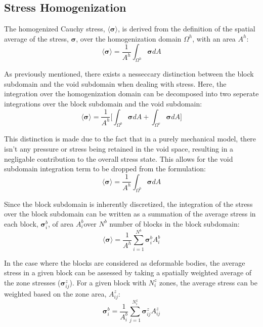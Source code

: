 \subsection{Stress Homogenization}
The homogenized Cauchy stress, $\langle \boldsymbol{\sigma} \rangle$, is derived from the definition of the spatial average of the stress, $\boldsymbol{\sigma}$, over the homogenization domain $\Omega^h$, with an area $A^h$:
\begin{equation}
\label{eqn:stress1}
\langle \boldsymbol{\sigma} \rangle = \frac{1}{A^h} \int_{\Omega^h} \boldsymbol{\sigma} {dA}
\end{equation}

As previously mentioned, there exists a nesseccary distinction between the block subdomain and the void subdomain when dealing with stress. Here, the integration over the homogenization domain can be decomposed into two seperate integrations over the block subdomain and the void subdomain:
\begin{equation}
\label{eqn:stress2}
\langle \boldsymbol{\sigma} \rangle = 
\frac{1}{A^h} \bigg \lbrack {\int_{\Omega^{b}} \boldsymbol{\sigma} {dA} + 
\int_{\Omega^{v}} \boldsymbol{\sigma} {dA}} \bigg \rbrack
\end{equation}

This distinction is made due to the fact that in a purely mechanical model, there isn't any pressure or stress being retained in the void space, resulting in a negligable contribution to the overall stress state. This allows for the void subdomain integration term to be dropped from the formulation:
\begin{equation}
\label{eqn:stress2a}
\langle \boldsymbol{\sigma} \rangle = 
\frac{1}{A^h} \int_{\Omega^{b}} \boldsymbol{\sigma} {dA}
\end{equation}

Since the block subdomain is inherently discretized, the integration of the stress over the block subdomain can be written as a summation of the average stress in each block, $\boldsymbol{\sigma}^b_i$, of area $A^b_i$over $N^b$ number of blocks in the block subdomain:
\begin{equation}
\label{eqn:stress3}
\langle \boldsymbol{\sigma} \rangle = 
\frac{1}{A^h} \sum_{i=1}^{N^{b}} \boldsymbol{\sigma}_{i}^b A^{b}_{i} 
\end{equation}

In the case where the blocks are considered as deformable bodies, the average stress in a given block can be assessed by taking a spatially weighted average of the zone stresses ($\boldsymbol{\sigma}^z_{ij}$). For a given block with $N_i^z$ zones, the average stress can be weighted based on the zone area, $A^{z}_{ij}$:
\begin{equation}
\label{eqn:stress3a}
\boldsymbol{\sigma}_{i}^b = 
\frac{1}{A^b_i} \sum_{j=1}^{N^{z}_i} \boldsymbol{\sigma}^z_{ij} A^{z}_{ij} 
\end{equation}

